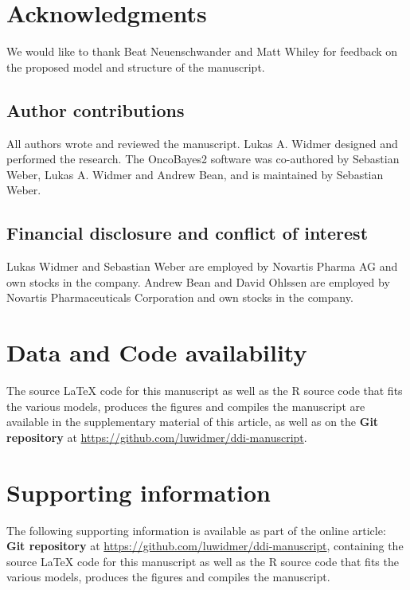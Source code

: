 \documentclass[AMA,STIX1COL]{WileyNJD-v2}
\begin{document}

\section*{Acknowledgments}
We would like to thank Beat Neuenschwander and Matt Whiley for feedback on the proposed model and structure of the manuscript.

\subsection*{Author contributions}
All authors wrote and reviewed the manuscript. Lukas A. Widmer designed and performed the research. The OncoBayes2 software was co-authored by Sebastian Weber, Lukas A. Widmer and Andrew Bean, and is maintained by Sebastian Weber.

\subsection*{Financial disclosure and conflict of interest}

Lukas Widmer and Sebastian Weber are employed by Novartis Pharma AG and own stocks in the company. Andrew Bean and David Ohlssen are employed by Novartis Pharmaceuticals Corporation and own stocks in the company.

\section*{Data and Code availability}
The source LaTeX code for this manuscript as well as the R source code that fits the various models, produces the figures and compiles the manuscript are available in the supplementary material of this article, as well as on the \textbf{Git repository} at \url{https://github.com/luwidmer/ddi-manuscript}. 

\section*{Supporting information}

The following supporting information is available as part of the online article:
\\

\noindent
\textbf{Git repository} at \url{https://github.com/luwidmer/ddi-manuscript}, containing the source LaTeX code for this manuscript as well as the R source code that fits the various models, produces the figures and compiles the manuscript.
\end{document}
